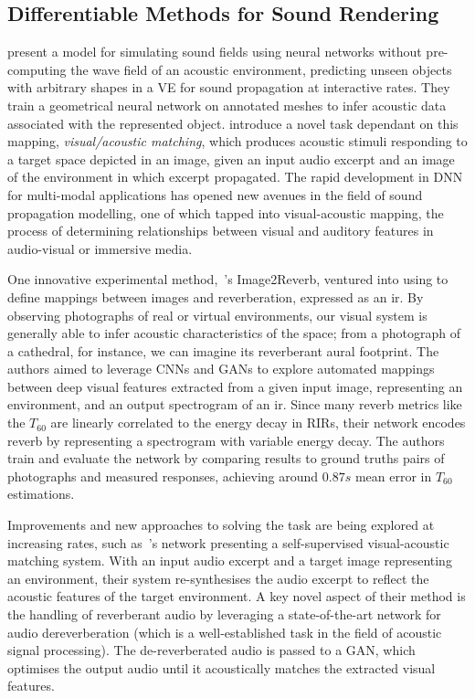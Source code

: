 \subsection{Differentiable Methods for Sound Rendering}
\cite{manocha2020differentiable} present a model for simulating sound fields using neural networks without pre-computing the wave field of an acoustic environment, predicting unseen objects with arbitrary shapes in a VE for sound propagation at interactive rates. They train a geometrical neural network on annotated meshes to infer acoustic data associated with the represented object.
\cite{chen2022visual} introduce a novel task dependant on this mapping, \textit{visual/acoustic matching}, which produces acoustic stimuli responding to a target space depicted in an image, given an input audio excerpt and an image of the environment in which excerpt propagated. The rapid development in DNN for multi-modal applications has opened new avenues in the field of sound propagation modelling, one of which tapped into visual-acoustic mapping, the process of determining relationships between visual and auditory features in audio-visual or immersive media.\par
One innovative experimental method,~\cite{Singh_2021_ICCV}'s Image2Reverb, ventured into using  to define mappings between images and reverberation, expressed as an \acrshort{ir}. By observing photographs of real or virtual environments, our visual system is generally able to infer acoustic characteristics of the space; from a photograph of a cathedral, for instance, we can imagine its reverberant aural footprint. The authors aimed to leverage CNNs and GANs to explore automated mappings between deep visual features extracted from a given input image, representing an environment, and an output spectrogram of an \acrshort{ir}. Since many reverb metrics like the $T_{60}$ are linearly correlated to the energy decay in RIRs, their network encodes reverb by representing a spectrogram with variable energy decay. The authors train and evaluate the network by comparing results to ground truths pairs of photographs and measured responses, achieving around $0.87s$ mean error in $T_{60}$ estimations.\par
Improvements and new approaches to solving the task are being explored at increasing rates, such as~\cite{somayazulu2023self}'s network presenting a self-supervised visual-acoustic matching system. With an input audio excerpt and a target image representing an environment, their system re-synthesises the audio excerpt to reflect the acoustic features of the target environment. A key novel aspect of their method is the handling of reverberant audio by leveraging a state-of-the-art network for audio dereverberation (which is a well-established task in the field of acoustic signal processing). The de-reverberated audio is passed to a GAN, which optimises the output audio until it acoustically matches the extracted visual features.\par

